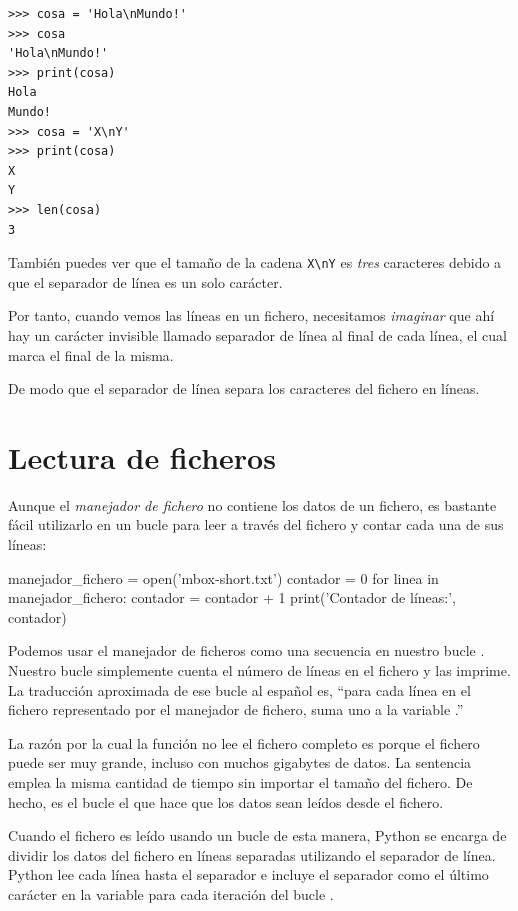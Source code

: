 \begin{Verbatim}[frame=single]
>>> cosa = 'Hola\nMundo!'
>>> cosa
'Hola\nMundo!'
>>> print(cosa)
Hola
Mundo!
>>> cosa = 'X\nY'
>>> print(cosa)
X
Y
>>> len(cosa)
3
\end{Verbatim}

También puedes ver que el tamaño de la cadena
\verb|X\nY| es \emph{tres} caracteres debido a que el
separador de línea es un solo carácter.

Por tanto, cuando vemos las líneas en un fichero, necesitamos
\emph{imaginar} que ahí hay un carácter invisible llamado separador de
línea al final de cada línea, el cual marca el final de la misma.

De modo que el separador de línea separa los caracteres del fichero en
líneas.

\hypertarget{lectura-de-ficheros}{%
\section{Lectura de ficheros}\label{lectura-de-ficheros}}

 

Aunque el \emph{manejador de fichero} no contiene los datos de un
fichero, es bastante fácil utilizarlo en un bucle  para leer
a través del fichero y contar cada una de sus líneas:

\begin{python}[frame=single]
manejador_fichero = open('mbox-short.txt')
contador = 0
for linea in manejador_fichero:
    contador = contador + 1
print('Contador de líneas:', contador)
\end{python}

Podemos usar el manejador de ficheros como una secuencia en nuestro
bucle . Nuestro bucle  simplemente cuenta el
número de líneas en el fichero y las imprime. La traducción aproximada
de ese bucle al español es, ``para cada línea en el fichero representado
por el manejador de fichero, suma uno a la variable .''

La razón por la cual la función  no lee el fichero completo
es porque el fichero puede ser muy grande, incluso con muchos gigabytes
de datos. La sentencia  emplea la misma cantidad de tiempo
sin importar el tamaño del fichero. De hecho, es el bucle 
el que hace que los datos sean leídos desde el fichero.

Cuando el fichero es leído usando un bucle  de esta manera,
Python se encarga de dividir los datos del fichero en líneas separadas
utilizando el separador de línea. Python lee cada línea hasta el
separador e incluye el separador como el último carácter en la variable
 para cada iteración del bucle .

